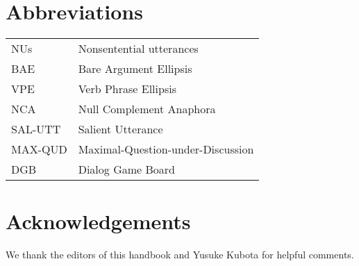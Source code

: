 \documentclass[output=paper
	        ,collection
	        ,collectionchapter
 	        ,biblatex
                ,babelshorthands
                ,newtxmath
                ,draftmode
                ,colorlinks, citecolor=brown
]{langscibook}
\begin{document}
{\section*{Abbreviations}

\begin{tabularx}{.99\textwidth}{@{}lX}
NUs & Nonsentential utterances\\
BAE & Bare Argument Ellipsis\\
VPE & Verb Phrase Ellipsis\\
NCA & Null Complement Anaphora\\
SAL-UTT & Salient Utterance\\
MAX-QUD & Maximal-Question-under-Discussion\\
DGB & Dialog Game Board\\
\end{tabularx}


\section*{Acknowledgements}
We thank the editors of this handbook and Yusuke Kubota for helpful comments.

{\sloppy
\printbibliography[heading=subbibliography,notkeyword=this]
}
%
}%
\end{document}
